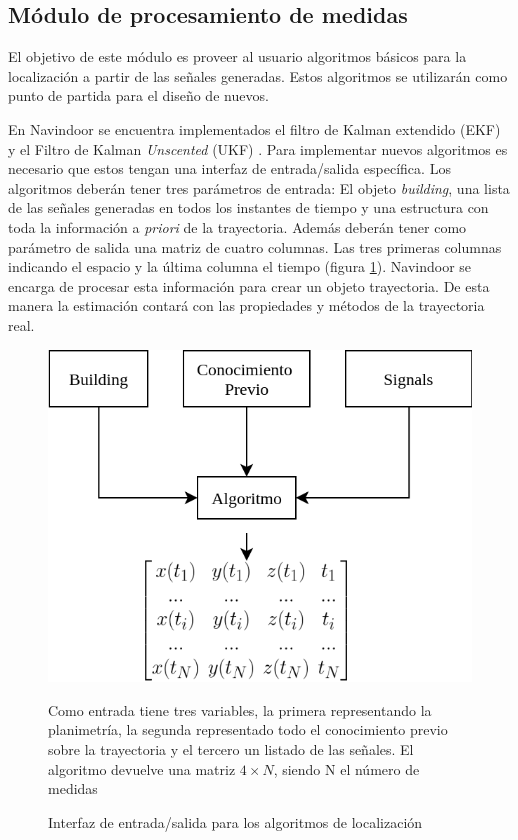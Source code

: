 
\subsection{Módulo de procesamiento de medidas}
El objetivo de este módulo es proveer al usuario algoritmos básicos para la localización a partir de las señales generadas. Estos algoritmos se utilizarán como punto de partida para el diseño de nuevos. 

En Navindoor se encuentra implementados  el filtro de Kalman extendido (EKF)\cite{Kay:1993:FSS:151045} y el Filtro de Kalman \emph{Unscented} (UKF) \cite{UKF}. Para implementar nuevos algoritmos es necesario que estos tengan una interfaz de entrada/salida específica. Los algoritmos deberán tener tres parámetros de entrada: El objeto \emph{building}, una lista de las señales generadas en todos los instantes de tiempo y una estructura con toda la información a \emph{priori} de la trayectoria. Además deberán tener como parámetro de salida una matriz de cuatro columnas. Las tres primeras columnas indicando el espacio y la última columna el tiempo (figura \ref{format}). Navindoor se encarga de procesar esta información para crear un objeto trayectoria. De esta manera la estimación contará con las propiedades y métodos de la trayectoria real.  
\begin{figure}[ht!]
    \centering
        \includegraphics[width=0.725\columnwidth]{img/Design/InterfazAlgo.png}
        \caption{Interfaz de entrada/salida para los algoritmos de localización}
        \footnotesize
        Como entrada tiene tres variables, la primera representando la planimetría, la segunda representado todo el conocimiento previo sobre la trayectoria y el tercero un listado de las señales. El algoritmo devuelve una matriz $4 \times N$, siendo N el número de medidas
        \label{format}
    \end{figure}

